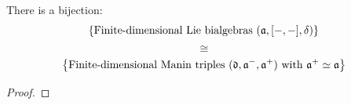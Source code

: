         \begin{proposition} \label{prop: manin_triples_classify_lie_bialgebras}
            There is a bijection:
                $$\left\{ \text{Finite-dimensional Lie bialgebras $(\mathfrak{a}, [-, -], \delta)$} \right\}$$
                $$\cong$$
                $$\left\{ \text{Finite-dimensional Manin triples $(\mathfrak{d}, \mathfrak{a}^-, \mathfrak{a}^+)$ with $\mathfrak{a}^+ \simeq \mathfrak{a}$} \right\}$$
        \end{proposition}
            \begin{proof}
                 
            \end{proof}
        \begin{example}
        \end{example}
        
